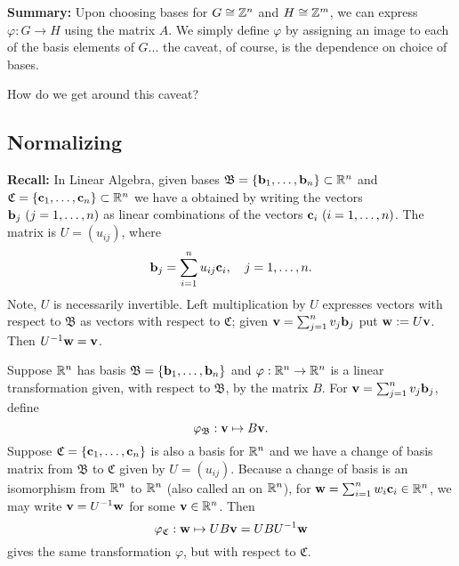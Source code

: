 \documentclass[../algebraNotesMSRI-UP2016.tex]{subfiles}
\begin{document}
\begin{frame}[c]{}{}
\textbf{Summary:} Upon choosing bases for $G\cong \mathbb Z^n$ and $H\cong \mathbb Z^m$, we can express $\varphi:G\to H$ using the matrix $A$.  We simply define $\varphi$ by assigning an image to each of the basis elements of $G$... the caveat, of course, is the dependence on choice of bases.

\smallGap
\begin{que}
How do we get around this caveat?
\end{que}
\end{frame}

\subsection[\subsecname]{Normalizing}
\begin{frame}{\subsecname}
\textbf{Recall:} In Linear Algebra, given bases $\mathfrak B=\{\mathbf b_1,\dots,\mathbf b_n\}\subset \mathbb R^n$ and $\mathfrak C=\{\mathbf c_1,\dots,\mathbf c_n\}\subset \mathbb R^n$ we have a  obtained by writing the vectors $\mathbf b_j\ (j=1,\dots,n)$ as linear combinations of the vectors $\mathbf c_i\ (i=1,\dots,n)$.  The matrix is $U=(u_{ij})$, where
\[
\mathbf b_j=\sum_{i=1}^nu_{ij}\mathbf c_i,\quad j=1,\dots,n.
\]
Note, $U$ is necessarily invertible.  Left multiplication by $U$ expresses vectors with respect to $\mathfrak B$ as vectors with respect to $\mathfrak C$; given $\mathbf v=\sum_{j=1}^nv_j\mathbf b_j$ put $\mathbf w:=U\mathbf v$.  Then $U^{-1}\mathbf w=\mathbf v$.
\end{frame}

\begin{frame}
\begin{ex}
Suppose $\mathbb R^n$ has basis $\mathfrak B=\{\mathbf b_1,\dots,\mathbf b_n\}$ and $\varphi:\mathbb R^n\to \mathbb R^n$ is a linear transformation given, with respect to $\mathfrak B$, by the matrix $B$.  For $\mathbf v=\sum_{j=1}^nv_j\mathbf b_j$, define
\[
\varphi_{\mathfrak B}:\mathbf v \mapsto B\mathbf v.
\]
Suppose $\mathfrak C=\{\mathbf c_1,\dots,\mathbf c_n\}$ is also a basis for $\mathbb R^n$ and we have a change of basis matrix from $\mathfrak B$ to $\mathfrak C$ given by $U=(u_{ij})$.  Because a change of basis is an isomorphism from $\mathbb R^n$ to $\mathbb R^n$ (also called an  on $\mathbb R^n$), for $\mathbf w=\sum_{i=1}^nw_i\mathbf c_i\in \mathbb R^n$, we may write $\mathbf v=U^{-1}\mathbf w$ for some $\mathbf v\in \mathbb R^n$.  Then    
\[
\varphi_{\mathfrak C}:\mathbf w\mapsto UB\mathbf v=UBU^{-1}\mathbf w
\]
gives the same transformation $\varphi$, but with respect to $\mathfrak C$.
\end{ex}
\end{frame}
\end{document}
